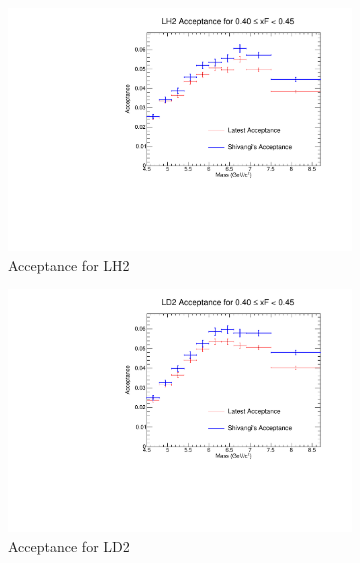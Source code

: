 \documentclass[11pt]{article}
\begin{document}
\begin{figure}[p]
    \centering
    \begin{subfigure}[b]{0.48\textwidth}
       \includegraphics[width=\linewidth]{./acceptancePlots/LH2_acceptance_xF_bin_8.pdf}
       \caption{Acceptance for LH2}
    \end{subfigure}\hfill
    \begin{subfigure}[b]{0.48\textwidth}
       \includegraphics[width=\linewidth]{./acceptancePlots/LD2_acceptance_xF_bin_8.pdf}
       \caption{Acceptance for LD2}
    \end{subfigure}
    \begin{subfigure}[b]{0.48\textwidth}

\end{subfigure}
\end{figure}
\end{document}
